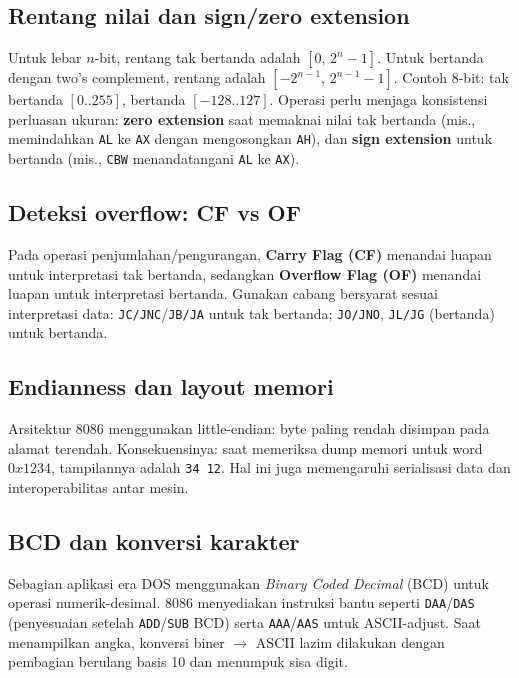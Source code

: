 \subsection{Rentang nilai dan sign/zero extension}
Untuk lebar \(n\)-bit, rentang tak bertanda adalah \([0,\,2^n-1]\). Untuk bertanda dengan two's complement, rentang adalah \([-2^{n-1},\,2^{n-1}-1]\). Contoh 8-bit: tak bertanda \([0..255]\), bertanda \([-128..127]\). Operasi perlu menjaga konsistensi perluasan ukuran: \textbf{zero extension} saat memaknai nilai tak bertanda (mis., memindahkan \texttt{AL} ke \texttt{AX} dengan mengosongkan \texttt{AH}), dan \textbf{sign extension} untuk bertanda (mis., \texttt{CBW} menandatangani \texttt{AL} ke \texttt{AX}). \cite{wiki_two_complement}

\subsection{Deteksi overflow: CF vs OF}
Pada operasi penjumlahan/pengurangan, \textbf{Carry Flag (CF)} menandai luapan untuk interpretasi tak bertanda, sedangkan \textbf{Overflow Flag (OF)} menandai luapan untuk interpretasi bertanda. Gunakan cabang bersyarat sesuai interpretasi data: \texttt{JC/JNC}/\texttt{JB/JA} untuk tak bertanda; \texttt{JO/JNO}, \texttt{JL/JG} (bertanda) untuk bertanda. \cite{intel2019manual32}

\subsection{Endianness dan layout memori}
Arsitektur 8086 menggunakan little-endian: byte paling rendah disimpan pada alamat terendah. Konsekuensinya: saat memeriksa dump memori untuk word \(0x1234\), tampilannya adalah \texttt{34 12}. Hal ini juga memengaruhi serialisasi data dan interoperabilitas antar mesin. \cite{wiki_endianness}

\subsection{BCD dan konversi karakter}
Sebagian aplikasi era DOS menggunakan \textit{Binary Coded Decimal} (BCD) untuk operasi numerik-desimal. 8086 menyediakan instruksi bantu seperti \texttt{DAA}/\texttt{DAS} (penyesuaian setelah \texttt{ADD}/\texttt{SUB} BCD) serta \texttt{AAA}/\texttt{AAS} untuk ASCII-adjust. Saat menampilkan angka, konversi biner \(\to\) ASCII lazim dilakukan dengan pembagian berulang basis 10 dan menumpuk sisa digit. \cite{intel2019manual32,rbil}

